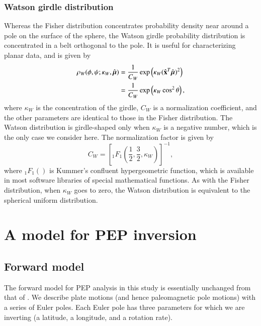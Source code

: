 \documentclass[preprint,12pt,authoryear]{elsarticle}
\newcommand{\mitbf}[1]{\hbox{\mathversion{bold}$#1$}}
\begin{document}
\subsubsection{Watson girdle distribution}
Whereas the Fisher distribution concentrates probability density near around a pole on
the surface of the sphere, the Watson girdle probability distribution is concentrated
in a belt orthogonal to the pole. It is useful for characterizing planar data, and is given by
\begin{equation}
  \begin{aligned}
  \rho_W(\phi, \psi; \kappa_W, \hat{\mitbf{\mu}}) 
  &= \frac{1}{C_W} \exp \left( \kappa_W (\hat{\mathbf{x}}^T \hat{\mitbf{\mu}})^2 \right) \\
  &= \frac{1}{C_W} \exp \left( \kappa_W \cos^2 \theta \right),
  \end{aligned}
\label{eq:watson}
\end{equation}
where $\kappa_W$ is the concentration of the girdle, $C_W$ is a normalization coefficient,
and the other parameters are identical to those in the Fisher distribution.
The Watson distribution is girdle-shaped only when $\kappa_W$ is a negative number, 
which is the only case we consider here.
The normalization factor is given by
\begin{equation}
  C_W = \left[ {}_1 F_1 \left( \frac{1}{2}, \frac{3}{2}, \kappa_W \right) \right]^{-1},
\end{equation}
where ${}_1 F_1()$ is Kummer's confluent hypergeometric function, which is available
in most software libraries of special mathematical functions.
As with the Fisher distribution, when $\kappa_W$ goes to zero, 
the Watson distribution is equivalent to the spherical uniform distribution.

\section{A model for PEP inversion}
\label{sec:model}
\subsection{Forward model}
\label{sec:forward_model}
The forward model for PEP analysis in this study is essentially unchanged from that of \citet{gordon1984paleomagnetic}.
We describe plate motions (and hence paleomagnetic pole motions) with a series of Euler poles.
Each Euler pole has three parameters for which we are inverting (a latitude, a longitude, and a rotation rate).
\end{document}
